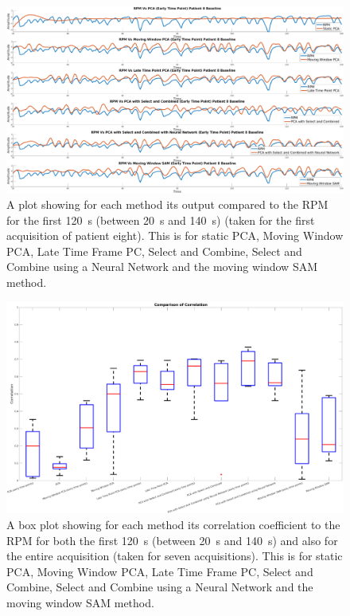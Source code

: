     \begin{figure}
        \centering
        
        \includegraphics[width=1.0\linewidth]{figures/patient_eight_output.png}
        
        \captionsetup{singlelinecheck=false, justification=centering}
        \caption{A plot showing for each method its output compared to the \gls{RPM} for the first \SI{120}{\second} (between \SI{20}{\second} and \SI{140}{\second}) (taken for the first acquisition of patient eight). This is for static \gls{PCA}, Moving Window \gls{PCA}, Late Time Frame \gls{PC}, Select and Combine, Select and Combine using a Neural Network and the moving window \gls{SAM} method.}
        \label{fig:patient_eight_output}
    \end{figure}
    
    \begin{figure}
        \centering
        
        \includegraphics[width=1.0\linewidth]{figures/box_plot.png}
        
        \captionsetup{singlelinecheck=false, justification=centering}
        \caption{A box plot showing for each method its correlation coefficient to the \gls{RPM} for both the first \SI{120}{\second} (between \SI{20}{\second} and \SI{140}{\second}) and also for the entire acquisition (taken for seven acquisitions). This is for static \gls{PCA}, Moving Window \gls{PCA}, Late Time Frame \gls{PC}, Select and Combine, Select and Combine using a Neural Network and the moving window \gls{SAM} method.}
        \label{fig:box_plot}
    \end{figure}
    
